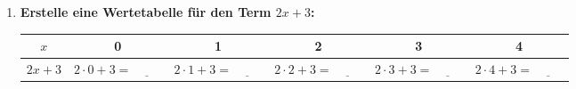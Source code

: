 \begin{enumerate}[label=\arabic*.]
    \item \textbf{Erstelle eine Wertetabelle für den Term $2x + 3$:}
    \vspace{0.5cm}

    \begin{center}
        \begin{tabular}{|c|c|c|c|c|c|}
            \hline
            $x$ & 0 & 1 & 2 & 3 & 4 \\
            \hline
            $2x + 3$ & $2 \cdot 0 + 3 = \underline{\hspace{1cm}}$ & $2 \cdot 1 + 3 = \underline{\hspace{1cm}}$ & $2 \cdot 2 + 3 = \underline{\hspace{1cm}}$ & $2 \cdot 3 + 3 = \underline{\hspace{1cm}}$ & $2 \cdot 4 + 3 = \underline{\hspace{1cm}}$ \\
            \hline
        \end{tabular}
    \end{center}
\end{enumerate}